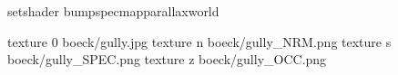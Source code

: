 setshader bumpspecmapparallaxworld

texture 0 boeck/gully.jpg
texture n boeck/gully_NRM.png
texture s boeck/gully_SPEC.png
texture z boeck/gully_OCC.png

